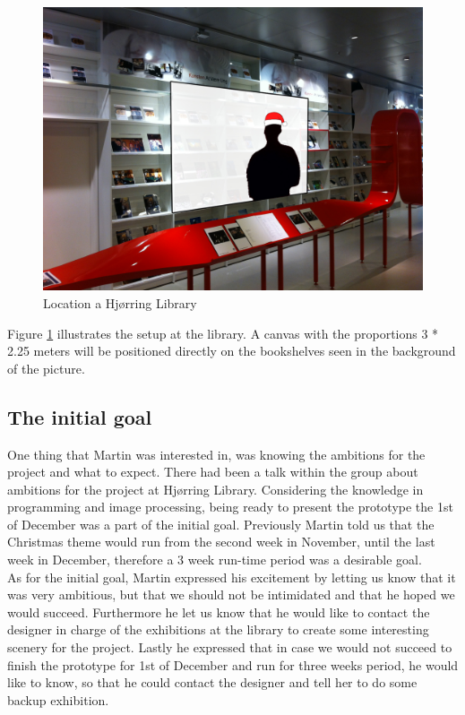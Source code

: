 \begin{figure}[htbp]
\centering
\includegraphics[width=1.00\textwidth]{Pictures/HjoerringLibrary/LocationJohannesHat.jpg}
\caption{Location a Hjørring Library}
\label{fig:concept_art}
\end{figure}
Figure \ref{fig:concept_art} illustrates the setup at the library. A canvas with the proportions 3 * 2.25 meters will be positioned directly on the bookshelves seen in the background of the picture.

\subsection{The initial goal}
One thing that Martin was interested in, was knowing the ambitions for the project and what to expect. There had been a talk within the group about ambitions for the project at Hjørring Library. Considering the knowledge in programming and image processing, being ready to present the prototype the 1st of December was a part of the initial goal. Previously Martin told us that the Christmas theme would run from the second week in November, until the last week in December, therefore a 3 week run-time period was a desirable goal.\\
As for the initial goal, Martin expressed his excitement by letting us know that it was very ambitious, but that we should not be intimidated and that he hoped we would succeed. Furthermore he let us know that he would like to contact the designer in charge of the exhibitions at the library to create some interesting scenery for the project. Lastly he expressed that in case we would not succeed to finish the prototype for 1st of December and run for three weeks period, he would like to know, so that he could contact the designer and tell her to do some backup exhibition.

